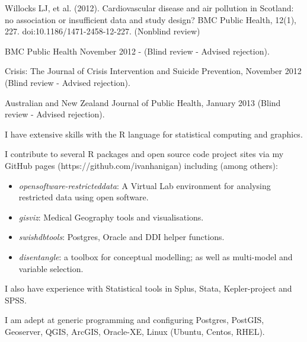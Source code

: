 \documentclass[a4paper,11pt]{article}
\begin{document}
\medskip
\renewcommand{\labelenumi}{\textsc{h}\theenumi.}
\begin{revnumerate}

\item Willocks LJ, et al. (2012). Cardiovascular disease and air pollution in Scotland: no association or insufficient data and study design? BMC Public Health, 12(1), 227. doi:10.1186/1471-2458-12-227. (Nonblind review)

\item BMC Public Health November 2012 - (Blind review - Advised rejection).

\item Crisis: The Journal of Crisis Intervention and Suicide Prevention, November 2012 (Blind review - Advised rejection).

\item Australian and New Zealand Journal of Public Health, January 2013 (Blind review - Advised rejection).

\end{revnumerate}

\medskip
\renewcommand{\labelenumi}{\textsc{i}\theenumi.}
\begin{revnumerate}

\item I have extensive skills with the R language for statistical computing and graphics.

\item I contribute to several R packages and open source code project sites via my GitHub pages (https://github.com/ivanhanigan) including (among others): 

\begin{itemize}
\item \emph{opensoftware-restricteddata}: A Virtual Lab environment for analysing restricted data using open software.
\item \emph{gisviz}: Medical Geography tools and visualisations.
\item \emph{swishdbtools}: Postgres, Oracle and DDI helper functions.
\item \emph{disentangle}: a toolbox for conceptual modelling; as well as multi-model and variable selection.
\end{itemize}

\item I also have experience with Statistical tools in Splus, Stata, Kepler-project and SPSS.

\item I am adept at generic programming and configuring Postgres, PostGIS, Geoserver, QGIS, ArcGIS,  Oracle-XE, Linux (Ubuntu, Centos, RHEL).
\end{revnumerate}
\end{document}
